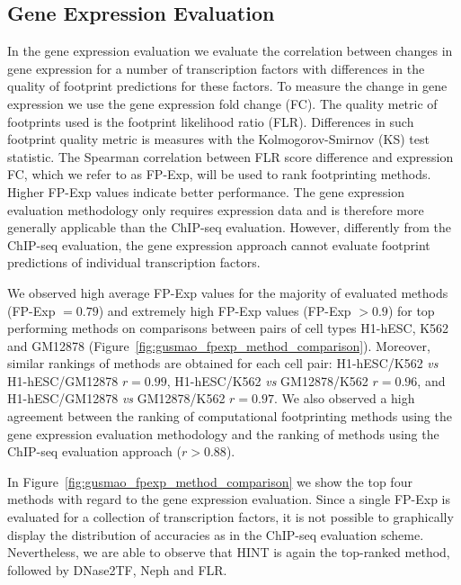 \subsection{Gene Expression Evaluation}
\label{sec:mc.gene.expression.evaluation}

In the gene expression evaluation we evaluate the correlation between changes in gene expression for a number of transcription factors with differences in the quality of footprint predictions for these factors. To measure the change in gene expression we use the gene expression fold change (FC). The quality metric of footprints used is the footprint likelihood ratio (FLR). Differences in such footprint quality metric is measures with the Kolmogorov-Smirnov (KS) test statistic. The Spearman correlation between FLR score difference and expression FC, which we refer to as FP-Exp, will be used to rank footprinting methods. Higher FP-Exp values indicate better performance. The gene expression evaluation methodology only requires expression data and is therefore more generally applicable than the ChIP-seq evaluation. However, differently from the ChIP-seq evaluation, the gene expression approach cannot evaluate footprint predictions of individual transcription factors.

We observed high average FP-Exp values for the majority of evaluated methods (FP-Exp $ = 0.79$) and extremely high FP-Exp values (FP-Exp $ > 0.9$) for top performing methods on comparisons between pairs of cell types H1-hESC, K562 and GM12878 (Figure~\ref{fig:gusmao_fpexp_method_comparison}). Moreover, similar rankings of methods are obtained for each cell pair: H1-hESC/K562 \textit{vs} H1-hESC/GM12878 $r = 0.99$, H1-hESC/K562 \textit{vs} GM12878/K562 $r = 0.96$, and H1-hESC/GM12878 \textit{vs} GM12878/K562 $r = 0.97$. We also observed a high agreement between the ranking of computational footprinting methods using the gene expression evaluation methodology and the ranking of methods using the ChIP-seq evaluation approach ($r > 0.88$).

In Figure~\ref{fig:gusmao_fpexp_method_comparison} we show the top four methods with regard to the gene expression evaluation. Since a single FP-Exp is evaluated for a collection of transcription factors, it is not possible to graphically display the distribution of accuracies as in the ChIP-seq evaluation scheme. Nevertheless, we are able to observe that HINT is again the top-ranked method, followed by DNase2TF, Neph and FLR.

